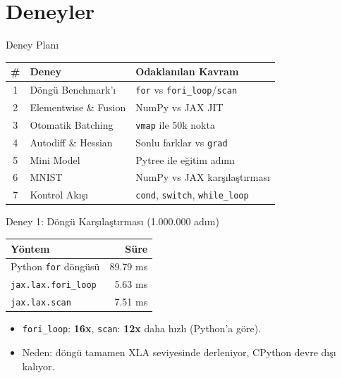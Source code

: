 \documentclass[aspectratio=169]{beamer}
\begin{document}
\section{Deneyler}

\begin{frame}{Deney Planı}
  \begin{table}
    \small
    \begin{tabular}{@{}cll@{}}
      \toprule
      \# & Deney & Odaklanılan Kavram \\
      \midrule
      1 & Döngü Benchmark'ı & \texttt{for} vs \texttt{fori\_loop}/\texttt{scan} \\
      2 & Elementwise \& Fusion & NumPy vs JAX JIT \\
      3 & Otomatik Batching & \texttt{vmap} ile 50k nokta \\
      4 & Autodiff \& Hessian & Sonlu farklar vs \texttt{grad} \\
      5 & Mini Model & Pytree ile eğitim adımı \\
      6 & MNIST & NumPy vs JAX karşılaştırması \\
      7 & Kontrol Akışı & \texttt{cond}, \texttt{switch}, \texttt{while\_loop} \\
      \bottomrule
    \end{tabular}
  \end{table}
\end{frame}

\begin{frame}{Deney 1: Döngü Karşılaştırması (1.000.000 adım)}
  \begin{table}
    \small
    \begin{tabular}{@{}lr@{}}
      \toprule
      Yöntem & Süre \\
      \midrule
      Python \texttt{for} döngüsü & 89.79 ms \\
      \texttt{jax.lax.fori\_loop} & 5.63 ms \\
      \texttt{jax.lax.scan} & 7.51 ms \\
      \bottomrule
    \end{tabular}
  \end{table}
  \begin{itemize}
    \item \texttt{fori\_loop}: \textbf{16x}, \texttt{scan}: \textbf{12x} daha hızlı (Python'a göre).
    \item Neden: döngü tamamen XLA seviyesinde derleniyor, CPython devre dışı kalıyor.
  \end{itemize}
\end{frame}
\end{document}
